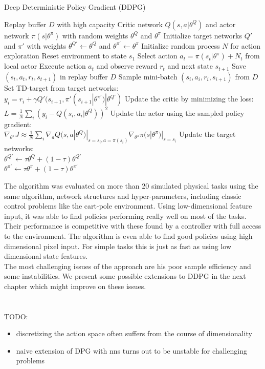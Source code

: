 \begin{algorithm}
	\caption{Deep Deterministic Policy Gradient (DDPG)}\label{DDPG-algo}
	\begin{algorithmic}
		\REQUIRE Replay buffer $\mathit{D}$ with high capacity
		\REQUIRE Critic network $Q(s,a|\theta^Q)$ and actor network $\pi(s|\theta^\pi)$ with random weights $\theta^Q$ and $\theta^\pi$
		\REQUIRE Initialize target networks $Q'$ and $\pi'$ with weights $\theta^{Q'}\leftarrow\theta^Q$ and $\theta^{\pi'}\leftarrow\theta^\pi$
		\STATE Initialize random process $\mathit{N}$ for action exploration
		\STATE Reset environment to state $s_1$
		\STATE Select action $a_t = \pi(s_t|\theta^\pi) + \mathit{N}_t$ from local actor
		\STATE Execute action $a_t$ and observe reward $r_t$ and next state $s_{t+1}$
		\STATE Save $(s_t, a_t, r_t,s_{t+1})$ in replay buffer $D$
		\STATE Sample mini-batch $(s_i, a_i, r_i,s_{i+1})$ from $D$
		\STATE Set TD-target from target networks:\\
		\qquad $y_i = r_i + \gamma Q'(s_{i+1}, \pi'(s_{i+1}|\theta^{\pi'})|\theta^{Q'})$
		\STATE Update the critic by minimizing the loss:\\
		\qquad $L=\frac{1}{N}\sum_i(y_i - Q(s_i,a_i|\theta^Q))^2$
		\STATE Update the actor using the sampled policy gradient:\\ 			\qquad $\nabla_{\theta^\pi}J \approx \frac{1}{N} \sum_i \nabla_a Q(s,a|\theta^Q)|_{s=s_i, a=\pi(s_i)}\nabla_{\theta^\pi}\pi(s|\theta^\pi)|_{s=s_i}$
		\STATE Update the target networks:\\
		\qquad $\theta^{Q'}\leftarrow \tau \theta^Q + (1-\tau)\theta^{Q'}$\\
		\qquad $\theta^{\pi'}\leftarrow \tau \theta^\pi + (1-\tau)\theta^{\pi'}$
		\ENDFOR
		\ENDFOR
	\end{algorithmic}
\end{algorithm}
The algorithm was evaluated on more than 20 simulated physical tasks using the same algorithm, network structures and hyper-parameters, including classic control problems like the cart-pole environment. Using low-dimensional feature input, it was able to find policies performing really well on most of the tasks. Their performance is competitive with these found by a controller with full access to the environment. The algorithm is even able to find good policies using high dimensional pixel input. For simple tasks this is just as fast as using low dimensional state features.\\
The most challenging issues of the approach are his poor sample efficiency and some instabilities. We present some possible extensions to DDPG in the next chapter which might improve on these issues.
\\
\\
\\
TODO:
\begin{itemize}
\item discretizing the action space often suffers from the course of dimensionality
\item naive extension of DPG with nns turns out to be unstable for challenging problems
\end{itemize}



